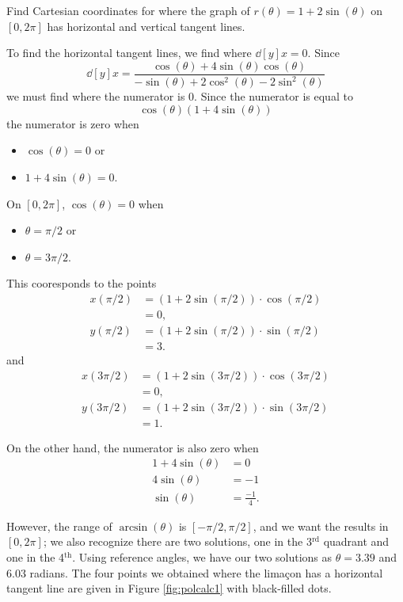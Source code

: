 \documentclass{ximera}
\begin{document}
\begin{example}
Find Cartesian coordinates for where the graph of $r(\theta)
=1+2\sin(\theta)$ on $[0,2\pi]$ has horizontal and vertical tangent
lines.
\begin{explanation}
  To find the horizontal tangent lines, we find where $\dd[y]{x}=0$.
  Since
  \[
  \dd[y]{x} =\frac{\cos(\theta) + 4\sin(\theta)\cos(\theta)}{-\sin(\theta) + 2\cos^2(\theta)-2\sin^2(\theta)}
  \]
  we must find where the numerator is $0$. Since the numerator is equal to
  \[
  \cos(\theta)(1+ 4\sin(\theta))
  \]
  the numerator is zero when 
  \begin{itemize}
  \item $\cos(\theta)=0$ or
  \item $1+4\sin(\theta)=0$.
  \end{itemize}
  On $[0,2\pi]$, $\cos(\theta)=0$ when
  \begin{itemize}
  \item $\theta=\pi/2$ or
  \item $\theta= 3\pi/2$.
  \end{itemize}
  This cooresponds to the points
  \begin{align*}
    x(\pi/2) &= \left(1+2\sin(\pi/2)\right)\cdot\cos(\pi/2)\\
    &= 0,\\
    y(\pi/2) &= \left(1+2\sin(\pi/2)\right)\cdot\sin(\pi/2)\\
    &= 3.
  \end{align*}
  and
  \begin{align*}
    x(3\pi/2) &= \left(1+2\sin(3\pi/2)\right)\cdot\cos(3\pi/2)\\
    &= 0,\\
    y(3\pi/2) &= \left(1+2\sin(3\pi/2)\right)\cdot\sin(3\pi/2)\\
    &= 1.
  \end{align*}
  
  On the other hand, the numerator is also zero when
  \begin{align*}
    1+ 4\sin(\theta)&=0\\
    4\sin(\theta)&=-1\\
    \sin(\theta)&=\frac{-1}{4}.
  \end{align*}
  
  However, the range of $\arcsin(\theta)$ is $[-\pi/2,\pi/2]$, and we
  want the results in $[0,2\pi]$; we also recognize there are two
  solutions, one in the 3$^\text{rd}$ quadrant and one in the
  4$^\text{th}$. Using reference angles, we have our two solutions as
  $\theta =3.39$ and $6.03$ radians. The four points we obtained where
  the lima\c con has a horizontal tangent line are given in Figure
  \ref{fig:polcalc1} with black-filled dots.


\end{explanation}
\end{example}
\end{document}
